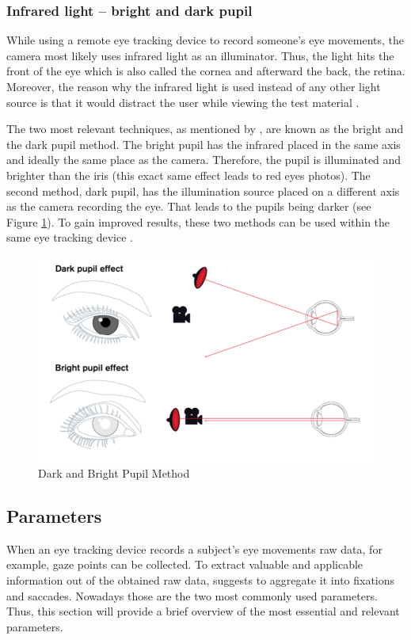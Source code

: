\subsubsection{Infrared light -- bright and dark pupil}
While using a remote eye tracking device to record someone's eye movements, the camera most likely uses infrared light as an illuminator. Thus, the light hits the front of the eye which is also called the cornea and afterward the back, the retina. 
Moreover, the reason why the infrared light is used instead of any other light source is that it would distract the user while viewing the test material \autocite[]{poole2006eye, biedert2010eyebook}.

The two most relevant techniques, as mentioned by \textcite[]{goldberg2002eye}, are known as the bright and the dark pupil method. The bright pupil has the infrared placed in the same axis and ideally the same place as the camera. Therefore, the pupil is illuminated and brighter than the iris (this exact same effect leads to red eyes photos). The second method, dark pupil, has the illumination source placed on a different axis as the camera recording the eye. That leads to the pupils being darker (see Figure \ref{figure:DarkBright}). To gain improved results, these two methods can be used within the same eye tracking device \autocite[]{tobii2018dark, goldberg2002eye}.

\begin{figure}[!ht]
	\centering
	\includegraphics[width=1\linewidth]{images/DarkBright.png}
	\caption{
		Dark and Bright Pupil Method \autocite[]{tobii2018dark}
	}
	\label{figure:DarkBright}
\end{figure}

\subsection{Parameters}
\label{subsection:Parameters}
When an eye tracking device records a subject's eye movements raw data, for example, gaze points can be collected. To extract valuable and applicable information out of the obtained raw data, \textcite[]{blascheck2014state}  suggests to aggregate it into fixations and saccades. 
Nowadays those are the two most commonly used parameters.
Thus, this section will provide a brief overview of the most essential and relevant parameters.

